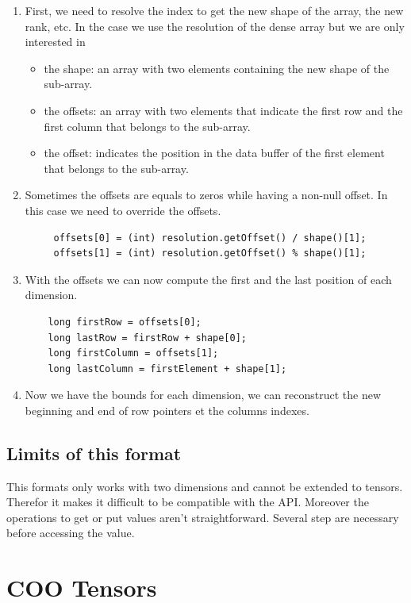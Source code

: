 \begin{enumerate}
\item First, we need to resolve the index to get the new shape of the array, the new rank, etc. In the case we use the resolution of the dense array but we are only interested in
\begin{itemize}
	\item the shape: an array with two elements containing the new shape of the sub-array.
	\item the offsets: an array with two elements that indicate the first row and the first column that belongs to the sub-array.
	\item the offset: indicates the position in the data buffer of the first element that belongs to the sub-array.
\end{itemize}
 \item Sometimes the offsets are equals to zeros while having a non-null offset. In this case we need to override the offsets.
\begin{lstlisting}
	 offsets[0] = (int) resolution.getOffset() / shape()[1];
	 offsets[1] = (int) resolution.getOffset() % shape()[1];
\end{lstlisting}
\item With the offsets we can now compute the first and the last position of each dimension.
\begin{lstlisting}
	long firstRow = offsets[0];
	long lastRow = firstRow + shape[0];
	long firstColumn = offsets[1];
	long lastColumn = firstElement + shape[1];
\end{lstlisting}
\item Now we have the bounds for each dimension, we can reconstruct the new beginning and end of row pointers et the columns indexes.
\end{enumerate}


\subsection{Limits of this format}

This formats only works with two dimensions and cannot be extended to tensors. Therefor it makes it difficult to be compatible with the API.
Moreover the operations to get or put values aren't straightforward. Several step are necessary before accessing the value.

\section{COO Tensors}

